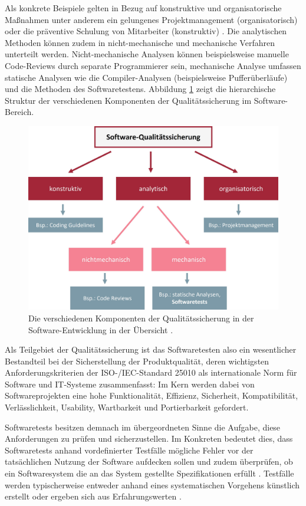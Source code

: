 Als konkrete Beispiele gelten in Bezug auf konstruktive und organisatorische Maßnahmen unter anderem ein gelungenes Projektmanagement (organisatorisch) oder die präventive Schulung von Mitarbeiter (konstruktiv) \cite[S. 272]{ludewig2010software}. Die analytischen Methoden können zudem in nicht-mechanische und mechanische Verfahren unterteilt werden. Nicht-mechanische Analysen können beispielsweise manuelle Code-Reviews durch separate Programmierer sein, mechanische Analyse umfassen statische Analysen wie die Compiler-Analysen (beispielsweise Pufferüberläufe) und die Methoden des Softwaretestens. Abbildung \ref{fig:qualitaetssicherung} zeigt die hierarchische Struktur der verschiedenen Komponenten der Qualitätssicherung im Software-Bereich.

\begin{figure}[!h]
\centering
\includegraphics[width=0.5\columnwidth]{images/Qualitaetssicherung_Uebersicht.jpg}
\caption{Die verschiedenen Komponenten der Qualitätssicherung in der Software-Entwicklung in der Übersicht \cite[S. 271]{ludewig2010software}.}
\label{fig:qualitaetssicherung}
\end{figure}


Als Teilgebiet der Qualitätssicherung ist das Softwaretesten also ein wesentlicher Bestandteil bei der Sicherstellung der Produktqualität, deren wichtigsten Anforderungskriterien der ISO-/IEC-Standard 25010 \cite{ISO25010} als internationale Norm für Software und IT-Systeme zusammenfasst: Im Kern werden dabei von Softwareprojekten eine hohe Funktionalität, Effizienz, Sicherheit, Kompatibilität, Verlässlichkeit, Usability, Wartbarkeit und Portierbarkeit gefordert.

Softwaretests besitzen demnach im übergeordneten Sinne die Aufgabe, diese Anforderungen zu prüfen und sicherzustellen. Im Konkreten bedeutet dies, dass Softwaretests anhand vordefinierter Testfälle mögliche Fehler vor der tatsächlichen Nutzung der Software aufdecken sollen und zudem überprüfen, ob ein Softwaresystem die an das System gestellte Spezifikationen erfüllt \cite[S. 246]{sommerville2012software-engineering}. Testfälle werden typischerweise entweder anhand eines systematischen Vorgehens künstlich erstellt oder ergeben sich aus Erfahrungswerten \cite{XXX}.  

